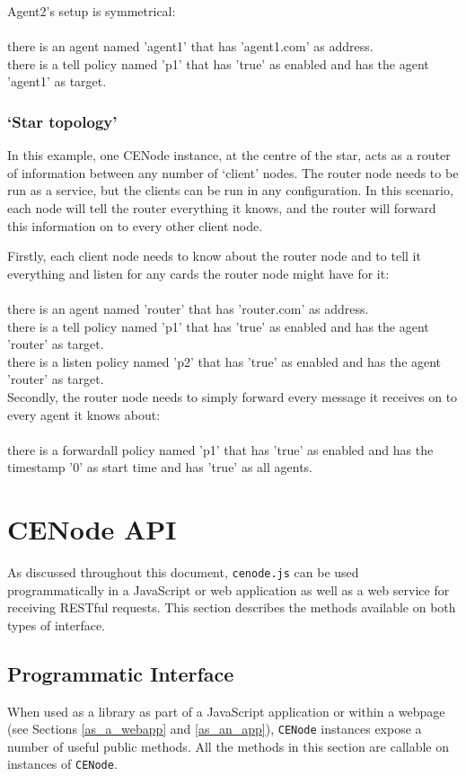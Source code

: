 \documentclass{scrartcl}
\newcommand{\ce}[1]{\textsf{#1}}
\newcommand{\js}[1]{\texttt{#1}}
\begin{document}
Agent2's setup is symmetrical:\\
\\\ce{there is an agent named 'agent1' that has 'agent1.com' as address.\\
there is a tell policy named 'p1' that has 'true' as enabled and has the agent 'agent1' as target.}\\


\subsubsection{`Star topology'}
In this example, one CENode instance, at the centre of the star, acts as a router of information between any number of `client' nodes. The router node needs to be run as a service, but the clients can be run in any configuration. In this scenario, each node will tell the router everything it knows, and the router will forward this information on to every other client node.

Firstly, each client node needs to know about the router node and to tell it everything and listen for any cards the router node might have for it:\\
\\\ce{there is an agent named 'router' that has 'router.com' as address.\\
there is a tell policy named 'p1' that has 'true' as enabled and has the agent 'router' as target.\\
there is a listen policy named 'p2'  that has 'true' as enabled and has the agent 'router' as target.}\\

Secondly, the router node needs to simply forward every message it receives on to every agent it knows about:\\
\\\ce{there is a forwardall policy named 'p1' that has 'true' as enabled and has the timestamp '0' as start time and has 'true' as all agents.}


\section{CENode API}
\label{api}
As discussed throughout this document, \js{cenode.js} can be used programmatically in a JavaScript or web application as well as a web service for receiving RESTful requests. This section describes the methods available on both types of interface.

\subsection{Programmatic Interface}
When used as a library as part of a JavaScript application or within a webpage (see Sections \ref{as_a_webapp} and \ref{as_an_app}), \js{CENode} instances expose a number of useful public methods. All the methods in this section are callable on instances of \js{CENode}.
\end{document}
